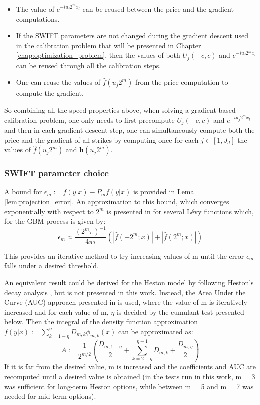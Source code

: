 \documentclass[12,twoside]{mammeTFM}
\theoremstyle{definition}
\theoremstyle{remark}
\begin{document}
\begin{itemize}
\item The value of $e^{-i u_j 2^m x_l}$ can be reused between the price and the gradient computations.
\item If the SWIFT parameters are not changed during the gradient descent used in the calibration problem that will be presented in Chapter \ref{chap:optimization_problem}, then the values of both $U_j(-c,c)$ and $e^{-i u_j 2^m x_l}$ can be reused through all the calibration steps.
\item One can reuse the values of $\hat{f}(u_j 2^m)$ from the price computation to compute the gradient. 
\end{itemize}
So combining all the speed properties above, when solving a gradient-based calibration problem, one only needs to first precompute $U_j(-c,c)$ and $e^{-i u_j 2^m x_l}$ and then in each gradient-descent step, one can simultaneously compute both the price and the gradient of all strikes by computing once for each $j \in [1, J_d]$ the values of $\hat{f}(u_j 2^m)$ and $\boldsymbol{h}(u_j 2^m)$.

\subsubsection{SWIFT parameter choice} \label{subsec:approximation_error}
A bound for $\epsilon_m := f(y|x) - P_mf(y|x)$ is provided in Lema \ref{lem:projection_error}. An approximation to this bound, which converges exponentially with respect to $2^m$ is presented in \cite{mar17} for several L\'evy functions which, for the GBM process is given by:
\begin{equation}
\epsilon_m \approx \dfrac{(2^m \pi)^{-1}}{4 \pi \tau}\left( \left| \hat{f}(-2^m;x) \right| + \left| \hat{f}(2^m;x)\right| \right)
\end{equation}

This provides an iterative method to try increasing values of m until the error $\epsilon_m$ falls under a desired threshold.

An equivalent result could be derived for the Heston model by following Heston's decay analysis \cite{Heston1993}, but is not presented in this work. Instead, the Area Under the Curve (AUC) approach presented in \cite{Ortiz-Gracia2016} is used, where the value of m is iteratively increased and for each value of m, $\eta$ is decided by the cumulant test presented below. Then the integral of the density function approximation $f(y|x) := \sum_{k = 1 - \eta}^{\eta} D_{m,k}\phi_{m,k}(x)$ can be approximated as:
\begin{equation}
A := \dfrac{1}{2^{m/2}}\left( \dfrac{D_{m, 1 - \eta}}{2} + \sum_{k = 2 - \eta}^{\eta - 1} D_{m, k} + \dfrac{D_{m, \eta}}{2} \right)
\end{equation}
If it is far from the desired value, m is increased and the coefficients and AUC are recomputed until a desired value is obtained (in the tests run in this work, m = 3 was sufficient for long-term Heston options, while between m = 5 and m = 7 was needed for mid-term options).
\end{document}
